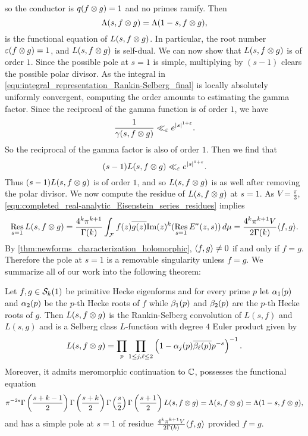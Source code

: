       so the conductor is $q(f \otimes g) = 1$ and no primes ramify. Then
      \[
        \Lambda(s,f \otimes g) = \Lambda(1-s,f \otimes g),
      \]
      is the functional equation of $L(s,f \otimes g)$. In particular, the root number $\varepsilon(f \otimes g) = 1$, and $L(s,f \otimes g)$ is self-dual. We can now show that $L(s,f \otimes g)$ is of order $1$. Since the possible pole at $s = 1$ is simple, multiplying by $(s-1)$ clears the possible polar divisor. As the integral in \cref{equ:integral_representation_Rankin-Selberg_final} is locally absolutely uniformly convergent, computing the order amounts to estimating the gamma factor. Since the reciprocal of the gamma function is of order $1$, we have
      \[
        \frac{1}{\gamma(s,f \otimes g)} \ll_{\varepsilon} e^{|s|^{1+\varepsilon}}.
      \]
      So the reciprocal of the gamma factor is also of order $1$. Then we find that
      \[
        (s-1)L(s,f \otimes g) \ll_{\varepsilon} e^{|s|^{1+\varepsilon}}.
      \]
      Thus $(s-1)L(s,f \otimes g)$ is of order $1$, and so $L(s,f \otimes g)$ is as well after removing the polar divisor. We now compute the residue of $L(s,f \otimes g)$ at $s = 1$. As $V = \frac{\pi}{3}$, \cref{equ:completed_real-analytic_Eisenstein_series_residues} implies
      \[
        \operatorname*{\mathrm{Res}}_{s = 1}L(s,f \otimes g) = \frac{4^{k}\pi^{k+1}}{\Gamma(k)}\int_{\mathcal{F}}f(z)\overline{g(z)}\mathrm{Im}(z)^{k}(\operatorname*{\mathrm{Res}}_{s = 1}E^{\ast}(z,s))\,d\mu = \frac{4^{k}\pi^{k+1}V}{2\Gamma(k)}\langle f,g\rangle.
      \]
      By \cref{thm:newforms_characterization_holomorphic}, $\langle f,g\rangle \neq 0$ if and only if $f = g$. Therefore the pole at $s = 1$ is a removable singularity unless $f = g$. We summarize all of our work into the following theorem:

      \begin{theorem}
        Let $f,g \in \mathcal{S}_{k}(1)$ be primitive Hecke eigenforms and for every prime $p$ let $\alpha_{1}(p)$ and $\alpha_{2}(p)$ be the $p$-th Hecke roots of $f$ while $\beta_{1}(p)$ and $\beta_{2}(p)$ are the $p$-th Hecke roots of $g$. Then $L(s,f \otimes g)$ is the Rankin-Selberg convolution of $L(s,f)$ and $L(s,g)$ and is a Selberg class $L$-function with degree $4$ Euler product given by
        \[
          L(s,f \otimes g) = \prod_{p}\prod_{1 \le j,\ell \le 2}\left(1-\alpha_{j}(p)\overline{\beta_{\ell}(p)}p^{-s}\right)^{-1}.
        \]
        Moreover, it admits meromorphic continuation to $\mathbb{C}$, possesses the functional equation
        \[
          \pi^{-2s}\Gamma\left(\frac{s+k-1}{2}\right)\Gamma\left(\frac{s+k}{2}\right)\Gamma\left(\frac{s}{2}\right)\Gamma\left(\frac{s+1}{2}\right)L(s,f \otimes g) = \Lambda(s,f \otimes g) = \Lambda(1-s,f \otimes g),
        \]
        and has a simple pole at $s = 1$ of residue $\frac{4^{k}\pi^{k+1}V}{2\Gamma(k)}\langle f,g\rangle$ provided $f = g$.
      \end{theorem}
